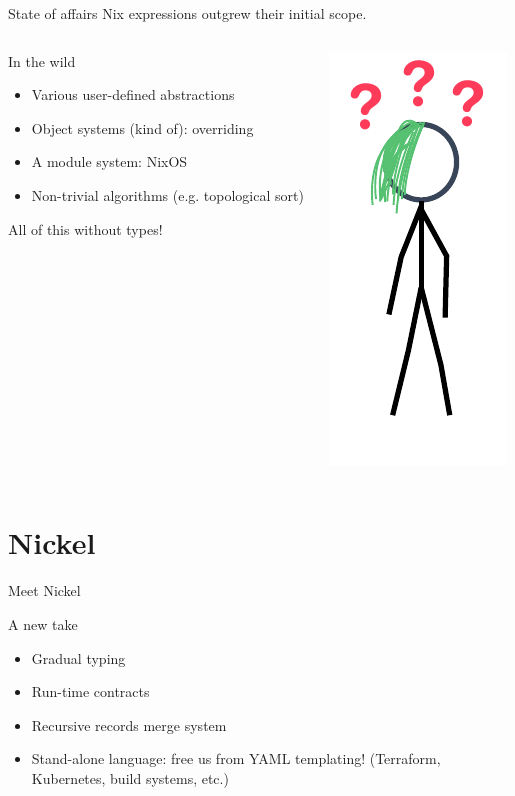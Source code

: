 \documentclass[aspectratio=169]{beamer}
\begin{document}
\begin{frame}{State of affairs}
    Nix expressions outgrew their initial scope.
    \begin{columns}
    \begin{column}{0.65\textwidth}
    \begin{exampleblock}{In the wild}
      \begin{itemize}
        \item Various user-defined abstractions
        \item Object systems (kind of): overriding
        \item A module system: NixOS
        \item Non-trivial algorithms (e.g. topological sort)
      \end{itemize}
    \end{exampleblock}
    All of this without types!
    \end{column}
    \begin{column}{0.30\textwidth}
        \includegraphics[height=0.7\textheight]{img/princess-comics-confused.pdf}
    \end{column}
\end{columns}
\end{frame}

\section{Nickel}

\begin{frame}{Meet Nickel}
    \begin{block}{A new take}
        \begin{itemize}
            \item Gradual typing
            \item Run-time contracts
            \item Recursive records merge system
            \item Stand-alone language: free us from YAML templating!
                (Terraform, Kubernetes, build systems, etc.)
        \end{itemize}
    \end{block}
\end{frame}
\end{document}
